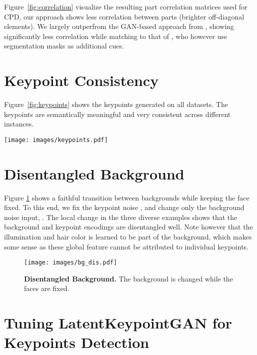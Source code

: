 \documentclass[10pt, conference, compsocconf]{IEEEtran}
\begin{document}
Figure~\ref{fig:correlation} visualize the resulting part correlation matrices used for CPD, our approach shows less correlation between parts (brighter off-diagonal elements). We largely outperfrom the GAN-based approach from \cite{collins2020editing}, showing significantly less correlation while matching to that of \cite{zhu2020sean}, who however use segmentation masks as additional cues.

%
 \section{Keypoint Consistency} Figure~\ref{fig:keypoints} shows the keypoints generated on all datasets. The keypoints are semantically meaningful and very consistent across different instances.

\begin{figure*}[ht]
\begin{center}
   \texttt{[image: images/keypoints.pdf]}
\end{center}
   \caption{\textbf{Keypoints.} We show the keypoints on each dataset.}
\label{fig:keypoints}
\end{figure*}

\section{Disentangled Background}
Figure \ref{fig:bg_dis} shows a faithful transition between backgrounds while keeping the face fixed. To this end, we fix the keypoint noise , and change only the background noise input, . The local change in the three diverse examples shows that the background and keypoint encodings are disentangled well. Note however that the illumination and hair color is learned to be part of the background, which makes some sense as these global feature cannot be attributed to individual keypoints.

\begin{figure}
 \vspace{1pt}
\texttt{[image: images/bg\_dis.pdf]}
  \caption{\textbf{Disentangled Background.} The background is changed while the faces are fixed.}
\label{fig:bg_dis}
\end{figure} \section{Tuning LatentKeypointGAN for Keypoints Detection}  \label{sec:supp_detection}
\end{document}
